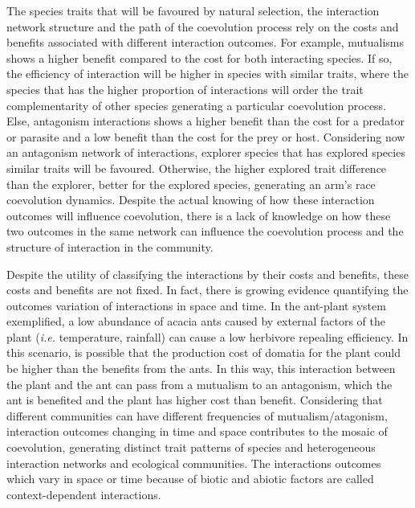 \documentclass[a4paper, 12pt]{article}
\begin{document}
The species traits that will be favoured by natural selection, the interaction network structure and the path of the coevolution process rely on the costs and benefits associated with different interaction outcomes. For example, mutualisms shows a higher benefit compared to the cost for both interacting species. If so, the efficiency of interaction will be higher in species with similar traits, where the species that has the higher proportion of interactions will order the trait complementarity of other species generating a particular coevolution process. Else, antagonism interactions shows a higher benefit than the cost for a predator or parasite and a low benefit than the cost for the prey or host. Considering now an antagonism network of interactions, explorer species that has explored species similar traits will be favoured. Otherwise, the higher explored trait difference than the explorer, better for the explored species, generating an arm's race coevolution dynamics. Despite the actual knowing of how these interaction outcomes will influence coevolution, there is a lack of knowledge on how these two outcomes in the same network can influence the coevolution process and the structure of interaction in the community.

Despite the utility of classifying the interactions by their costs and benefits, these costs and benefits are not fixed. In fact, there is growing evidence quantifying the outcomes variation of interactions in space and time. In the ant-plant system exemplified, a low abundance of acacia ants caused by external factors of the plant (\textit{i.e.} temperature, rainfall) can cause a low herbivore repealing efficiency. In this scenario, is possible that the production cost of domatia for the plant could be higher than the benefits from the ants. In this way, this interaction between the plant and the ant can pass from a mutualism to an antagonism, which the ant is benefited and the plant has higher cost than benefit. Considering that different communities can have different frequencies of mutualism/atagonism, interaction outcomes changing in time and space contributes to the mosaic of coevolution, generating distinct trait patterns of species and heterogeneous interaction networks and ecological communities. The interactions outcomes which vary in space or time because of biotic and abiotic factors are called context-dependent interactions.
\end{document}
